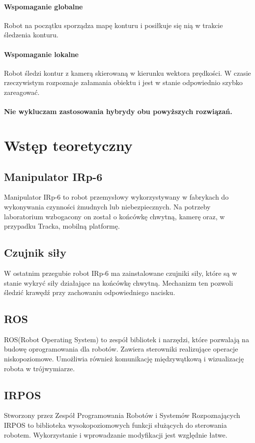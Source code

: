 \documentclass[12pt, a4paper, twoside]{book}
\begin{document}
			\subsubsection{Wspomaganie globalne}
			Robot na początku sporządza mapę konturu i posiłkuje się nią w trakcie śledzenia konturu.
			\subsubsection{Wspomaganie lokalne}
			Robot śledzi kontur z kamerą skierowaną w kierunku wektora prędkości. W czasie rzeczywistym rozpoznaje załamania obiektu i jest w stanie odpowiednio szybko zareagować.
			\subsubsection{Nie wykluczam zastosowania hybrydy obu powyższych rozwiązań.}
\chapter{Wstęp teoretyczny}
	\section{Manipulator IRp-6}
	Manipulator IRp-6 to robot przemysłowy wykorzystywany w fabrykach do wykonywania czynności żmudnych lub niebezpiecznych. Na potrzeby laboratorium wzbogacony on został o końcówkę chwytną, kamerę oraz, w przypadku Tracka, mobilną platformę. 
	\section{Czujnik siły}
	W ostatnim przegubie robot IRp-6 ma zainstalowane czujniki siły, które są w stanie wykryć siły działające na końcówkę chwytną. Mechanizm ten pozwoli śledzić krawędź przy zachowaniu odpowiedniego nacisku.
	\section{ROS}
	ROS(Robot Operating System) to zespół bibliotek i narzędzi, które pozwalają na budowę oprogramowania dla robotów. Zawiera sterowniki realizujące operacje niskopoziomowe. Umożliwia również komunikację międzywątkową i wizualizację robota w trójwymiarze.
	\section{IRPOS}
	Stworzony przez Zespół Programowania Robotów i Systemów Rozpoznających IRPOS to biblioteka wysokopoziomowych funkcji służących do sterowania robotem. Wykorzystanie i wprowadzanie modyfikacji jest względnie łatwe.
\end{document}

